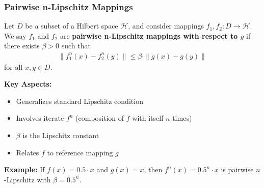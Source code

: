 \documentclass[aspectratio=169,10pt]{beamer}
\begin{document}
\begin{frame}
\frametitle{Pairwise n-Lipschitz Mappings}

\begin{definition}[Definition 9.10]
Let $D$ be a subset of a Hilbert space $\mathcal{H}$, and consider mappings $f_1, f_2 : D \to \mathcal{H}$.
We say $f_1$ and $f_2$ are \textbf{pairwise n-Lipschitz mappings with respect to $g$} if
there exists $\beta > 0$ such that
\begin{align*}
\|f_1^n(x) - f_2^n(y)\| \leq \beta \cdot \|g(x) - g(y)\|
\end{align*}
for all $x, y \in D$.
\end{definition}

\vspace{0.3cm}

\textbf{Key Aspects:}
\begin{itemize}
    \item Generalizes standard Lipschitz condition
    \item Involves iterate $f^n$ (composition of $f$ with itself $n$ times)
    \item $\beta$ is the Lipschitz constant
    \item Relates $f$ to reference mapping $g$
\end{itemize}

\vspace{0.3cm}

\textbf{Example:} If $f(x) = 0.5 \cdot x$ and $g(x) = x$, then $f^n(x) = 0.5^n \cdot x$
is pairwise $n$-Lipschitz with $\beta = 0.5^n$.

\end{frame}
\end{document}
